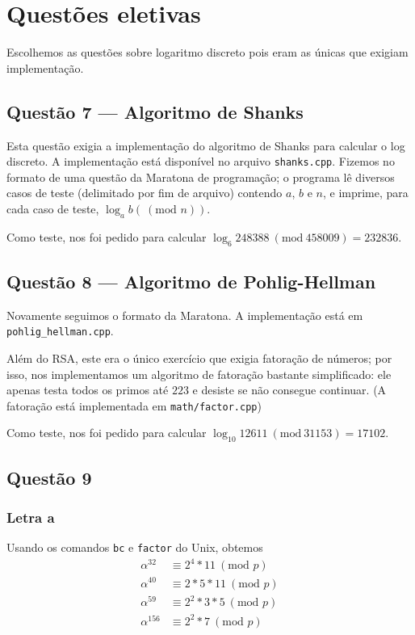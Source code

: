 \documentclass{article}
\renewcommand{\mod}[1]{ \ (\textrm{mod } #1) }
\begin{document}
\section{Questões eletivas}

Escolhemos as questões sobre logaritmo discreto
pois eram as únicas que exigiam implementação.

\subsection{Questão 7 --- Algoritmo de Shanks}

Esta questão exigia a implementação do algoritmo de Shanks para calcular o log discreto.
A implementação está disponível no arquivo \verb"shanks.cpp".
Fizemos no formato de uma questão da Maratona de programação;
o programa lê diversos casos de teste (delimitado por fim de arquivo)
contendo $a$, $b$ e $n$,
e imprime, para cada caso de teste, $\log_a b (\mod n)$.

Como teste, nos foi pedido para calcular $\log_6 248388\ (\mathrm{mod}\ 458009) = 232836$.

\subsection{Questão 8 --- Algoritmo de Pohlig-Hellman}

Novamente seguimos o formato da Maratona.
A implementação está em \verb"pohlig_hellman.cpp".

Além do RSA, este era o único exercício que exigia fatoração de números;
por isso, nos implementamos um algoritmo de fatoração bastante simplificado:
ele apenas testa todos os primos até $223$ e desiste se não consegue continuar.
(A fatoração está implementada em \verb"math/factor.cpp")

Como teste, nos foi pedido para calcular $\log_{10} 12611\ (\mathrm{mod}\ 31153) = 17102$.

\subsection{Questão 9}

\subsubsection{Letra a}

Usando os comandos \verb"bc" e \verb"factor" do Unix, obtemos
\begin{align*}
    \alpha^{32} &\equiv 2^4 * 11 \mod{p} \\
    \alpha^{40} &\equiv 2*5*11 \mod{p} \\
    \alpha^{59} &\equiv 2^2*3*5 \mod{p} \\
    \alpha^{156} &\equiv 2^2*7 \mod{p}
\end{align*}
\end{document}
